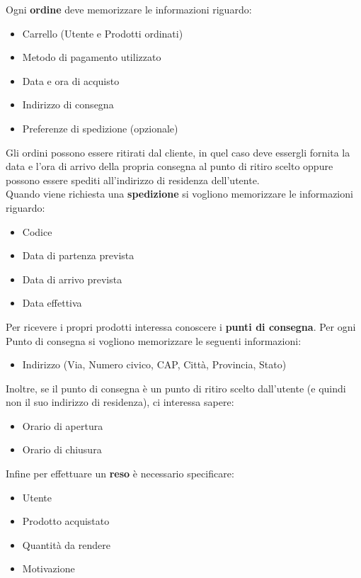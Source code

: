 \documentclass[10pt]{article}
\begin{document}
Ogni \textbf{ordine} deve memorizzare le informazioni riguardo:
\begin{itemize}
    \itemsep0em 
    \item Carrello (Utente e Prodotti ordinati)
    \item Metodo di pagamento utilizzato
    \item Data e ora di acquisto
    \item Indirizzo di consegna
    \item Preferenze di spedizione (opzionale)
\end{itemize}
Gli ordini possono essere ritirati dal cliente, in quel caso deve essergli fornita la data e l’ora di arrivo della propria consegna al punto di ritiro
scelto oppure possono essere spediti all'indirizzo di residenza dell'utente.\\
Quando viene richiesta una \textbf{spedizione} si vogliono memorizzare le informazioni riguardo:
\begin{itemize}
    \itemsep0em 
    \item Codice
    \item Data di partenza prevista
    \item Data di arrivo prevista
    \item Data effettiva
\end{itemize}
Per ricevere i propri prodotti interessa conoscere i \textbf{punti di consegna}. Per ogni Punto di consegna si vogliono
memorizzare le seguenti informazioni:
\begin{itemize}
    \itemsep0em 
    \item Indirizzo (Via, Numero civico, CAP, Città, Provincia, Stato)
\end{itemize}
Inoltre, se il punto di consegna è un punto di ritiro scelto dall'utente (e quindi non il suo indirizzo di residenza), ci interessa sapere:
\begin{itemize}
    \itemsep0em 
    \item Orario di apertura
    \item Orario di chiusura
\end{itemize}
Infine per effettuare un \textbf{reso} è necessario specificare:
\begin{itemize}
    \itemsep0em 
    \item Utente
    \item Prodotto acquistato
    \item Quantità da rendere
    \item Motivazione 
\end{itemize}
\end{document}

